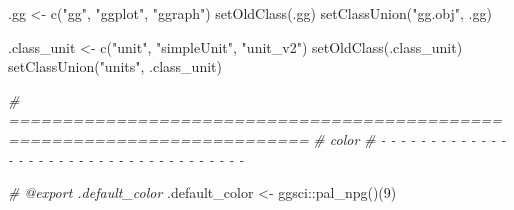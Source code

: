 \documentclass[
]{article}
\newenvironment{Shaded}{\begin{snugshade}}{\end{snugshade}}
\newcommand{\CommentTok}[1]{\textcolor[rgb]{0.56,0.35,0.01}{\textit{#1}}}
\newcommand{\DecValTok}[1]{\textcolor[rgb]{0.00,0.00,0.81}{#1}}
\newcommand{\FunctionTok}[1]{\textcolor[rgb]{0.00,0.00,0.00}{#1}}
\newcommand{\NormalTok}[1]{#1}
\newcommand{\OtherTok}[1]{\textcolor[rgb]{0.56,0.35,0.01}{#1}}
\newcommand{\SpecialCharTok}[1]{\textcolor[rgb]{0.00,0.00,0.00}{#1}}
\newcommand{\StringTok}[1]{\textcolor[rgb]{0.31,0.60,0.02}{#1}}
\begin{document}
\begin{Shaded}
\begin{Highlighting}[]
\NormalTok{.gg }\OtherTok{\textless{}{-}} \FunctionTok{c}\NormalTok{(}\StringTok{"gg"}\NormalTok{, }\StringTok{"ggplot"}\NormalTok{, }\StringTok{"ggraph"}\NormalTok{)}
\FunctionTok{setOldClass}\NormalTok{(.gg)}
\FunctionTok{setClassUnion}\NormalTok{(}\StringTok{"gg.obj"}\NormalTok{, .gg)}

\NormalTok{.class\_unit }\OtherTok{\textless{}{-}} \FunctionTok{c}\NormalTok{(}\StringTok{"unit"}\NormalTok{, }\StringTok{"simpleUnit"}\NormalTok{, }\StringTok{"unit\_v2"}\NormalTok{)}
\FunctionTok{setOldClass}\NormalTok{(.class\_unit)}
\FunctionTok{setClassUnion}\NormalTok{(}\StringTok{"units"}\NormalTok{, .class\_unit)}
\end{Highlighting}
\end{Shaded}

\begin{Shaded}
\begin{Highlighting}[]
\CommentTok{\# ==========================================================================}
\CommentTok{\# color}
\CommentTok{\# {-} {-} {-} {-} {-} {-} {-} {-} {-} {-} {-} {-} {-} {-} {-} {-} {-} {-} {-} {-} {-} {-} {-} {-} {-} {-} {-} {-} {-} {-} {-} {-} {-} {-} {-} {-} {-}}

\CommentTok{\#\textquotesingle{} @export .default\_color}
\NormalTok{.default\_color }\OtherTok{\textless{}{-}}\NormalTok{ ggsci}\SpecialCharTok{::}\FunctionTok{pal\_npg}\NormalTok{()(}\DecValTok{9}\NormalTok{)}
\end{Highlighting}
\end{Shaded}
\end{document}
